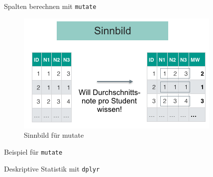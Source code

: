 \begin{frame}{Spalten berechnen mit \texttt{mutate}}

\begin{figure}

{\centering \includegraphics[width=0.8\linewidth]{../images/Datenjudo/mutate} 

}

\caption{Sinnbild für mutate}\label{fig:fig-mutate}
\end{figure}

\end{frame}

\begin{frame}[fragile]{Beispiel für \texttt{mutate}}

\begin{Shaded}
\end{Shaded}

\end{frame}

\begin{frame}[fragile]{Deskriptive Statistik mit \texttt{dplyr}}

\begin{Shaded}
\begin{Highlighting}[]
\StringTok{ }\OperatorTok{-}
\end{Highlighting}
\end{Shaded}

\end{frame}

